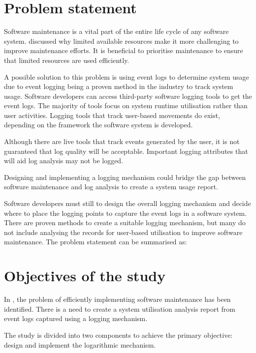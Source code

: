 \section{Problem statement}\label{sec:ch1_problemStatement}
Software maintenance is a vital part of the entire life cycle of any software system.  discussed why limited available resources make it more challenging to improve maintenance efforts. It is beneficial to prioritise maintenance to ensure that limited resources are used efficiently. \par A possible solution to this problem is using event logs to determine system usage due to event logging being a proven method in the industry to track system usage. Software developers can access third-party software logging tools to get the event logs. The majority of tools focus on system runtime utilisation rather than user activities. Logging tools that track user-based movements do exist, depending on the framework the software system is developed. \par Although there are live tools that track events generated by the user, it is not guaranteed that log quality will be acceptable. Important logging attributes that will aid log analysis may not be logged. \par Designing and implementing a logging mechanism could bridge the gap between software maintenance and log analysis to create a system usage report. \par Software developers must still to design the overall logging mechanism and decide where to place the logging points to capture the event logs in a software system. There are proven methods to create a suitable logging mechanism, but many do not include analysing the records for user-based utilisation to improve software maintenance. The problem statement can be summarised as:

\begin{center}
	\begin{tcolorbox}[colback=lightgray, colframe=black, sharp corners=all, arc=4pt]
		\begin{minipage}{\textwidth}
			\RaggedRight\textit{\problemStatement}
		\end{minipage}
	\end{tcolorbox}
\end{center}

\clearpage

\section{Objectives of the study}\label{sec:ch1_objectives}
In , the problem of efficiently implementing software maintenance has been identified. There is a need to create a system utilisation analysis report from event logs captured using a logging mechanism. \par The study is divided into two components to achieve the primary objective: design and implement the logarithmic mechanism. 

